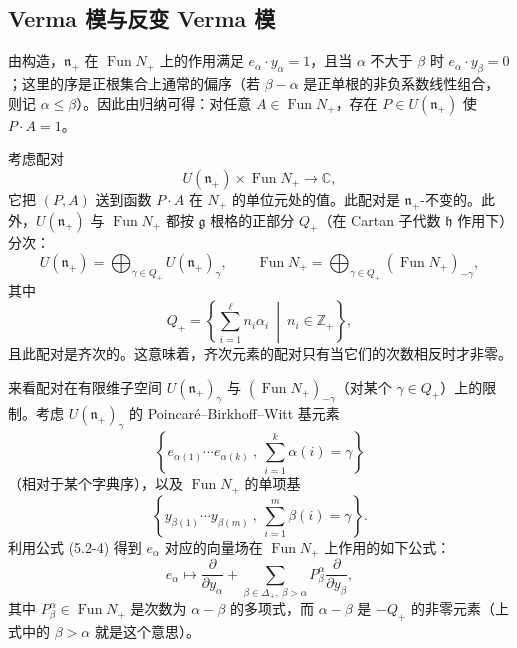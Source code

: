 
\subsection{Verma 模与反变 Verma 模}

由构造，$\mathfrak{n}_+$ 在 $\operatorname{Fun}N_+$ 上的作用满足 $e_\alpha\cdot y_\alpha=1$，且当 $\alpha$ 不大于 $\beta$ 时 $e_\alpha\cdot y_\beta=0$；这里的序是正根集合上通常的偏序（若 $\beta-\alpha$ 是正单根的非负系数线性组合，则记 $\alpha\le\beta$）。因此由归纳可得：对任意 $A\in\operatorname{Fun}N_+$，存在 $P\in U(\mathfrak{n}_+)$ 使 $P\cdot A=1$。

考虑配对
\[
    U(\mathfrak{n}_+)\times\operatorname{Fun}N_+\to\mathbb{C},
\]
它把 $(P,A)$ 送到函数 $P\cdot A$ 在 $N_+$ 的单位元处的值。此配对是 $\mathfrak{n}_+$-不变的。此外，$U(\mathfrak{n}_+)$ 与 $\operatorname{Fun}N_+$ 都按 $\mathfrak{g}$ 根格的正部分 $Q_+$（在 Cartan 子代数 $\mathfrak{h}$ 作用下）分次：
\[
    U(\mathfrak{n}_+)=\bigoplus_{\gamma\in Q_+}U(\mathfrak{n}_+)_\gamma,
    \qquad
    \operatorname{Fun}N_+=\bigoplus_{\gamma\in Q_+}(\operatorname{Fun}N_+)_{-\gamma},
\]
其中
\[
    Q_+=\left\{\sum_{i=1}^{\ell}n_i\alpha_i\ \middle|\ n_i\in\mathbb{Z}_+\right\},
\]
且此配对是齐次的。这意味着，齐次元素的配对只有当它们的次数相反时才非零。

来看配对在有限维子空间 $U(\mathfrak{n}_+)_\gamma$ 与 $(\operatorname{Fun}N_+)_{-\gamma}$（对某个 $\gamma\in Q_+$）上的限制。考虑 $U(\mathfrak{n}_+)_\gamma$ 的 Poincaré--Birkhoff--Witt 基元素
\begin{equation}
    \left\{e_{\alpha(1)}\cdots e_{\alpha(k)}\ ,\ \sum_{i=1}^{k}\alpha(i)=\gamma\right\}
    \tag{5.2-7}
\end{equation}
（相对于某个字典序），以及 $\operatorname{Fun}N_+$ 的单项基
\[
    \left\{y_{\beta(1)}\cdots y_{\beta(m)}\ ,\ \sum_{i=1}^{m}\beta(i)=\gamma\right\}.
\]
利用公式 (5.2-4) 得到 $e_\alpha$ 对应的向量场在 $\operatorname{Fun}N_+$ 上作用的如下公式：
\begin{equation}
    e_\alpha\mapsto\frac{\partial}{\partial y_\alpha}
    +\sum_{\beta\in\Delta_+,\ \beta>\alpha}P_\beta^\alpha\frac{\partial}{\partial y_\beta},
    \tag{5.2-8}
\end{equation}
其中 $P_\beta^\alpha\in\operatorname{Fun}N_+$ 是次数为 $\alpha-\beta$ 的多项式，而 $\alpha-\beta$ 是 $-Q_+$ 的非零元素（上式中的 $\beta>\alpha$ 就是这个意思）。

